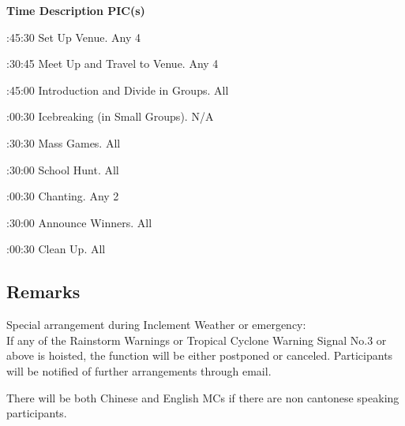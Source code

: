 \bTR\bTH    \bf{Time}
\eTH\bTH    \bf{Description}
\eTH\bTH    \bf{PIC(s)}
\eTH\eTR

\eTABLEhead
\bTABLEbody

\bTR{}:45:30
\eTD\bTD Set Up Venue.
\eTD\bTD Any 4
\eTD\eTR

\bTR{}:30:45
\eTD\bTD Meet Up and Travel to Venue.
\eTD\bTD Any 4
\eTD\eTR

\bTR{}:45:00
\eTD\bTD Introduction and Divide in Groups.
\eTD\bTD All
\eTD\eTR

\bTR{}:00:30
\eTD\bTD Icebreaking (in Small Groups).
\eTD\bTD N/A
\eTD\eTR

\bTR{}:30:30
\eTD\bTD Mass Games.
\eTD\bTD All
\eTD\eTR

\bTR{}:30:00
\eTD\bTD School Hunt.
\eTD\bTD All
\eTD\eTR

\bTR{}:00:30
\eTD\bTD Chanting.
\eTD\bTD Any 2
\eTD\eTR

\bTR{}:30:00
\eTD\bTD Announce Winners.
\eTD\bTD All
\eTD\eTR

\bTR{}:00:30
\eTD\bTD Clean Up.
\eTD\bTD All
\eTD\eTR

\eTABLEbody
\eTABLE

\subsection{Remarks}
\startitemize
\item Special arrangement during Inclement Weather or emergency: \\
If any of the Rainstorm Warnings or Tropical Cyclone Warning Signal No.3 or above is hoisted, the function will be either postponed or canceled. Participants will be notified of further arrangements through email.
\item There will be both Chinese and English MCs if there are non cantonese speaking participants.
\stopitemize

\pagebreak
